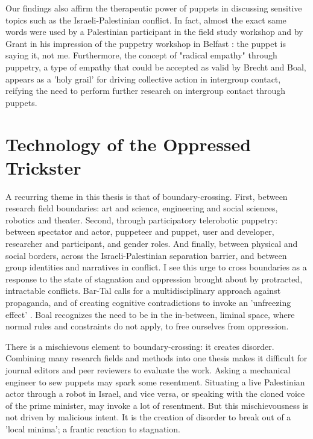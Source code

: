 \documentclass[dissertation,math,vertlayout,pdfa,colorlinks,nologo]{aaltoseries}
\begin{document}
Our findings also affirm the therapeutic power of puppets in discussing sensitive topics such as the Israeli-Palestinian conflict. In fact, almost the exact same words were used by a Palestinian participant in the field study workshop and by Grant in his impression of the puppetry workshop in Belfast \cite{grantObjectsObjectivesApplied2020}: the puppet is saying it, not me. Furthermore, the concept of "radical empathy" through puppetry, a type of empathy that could be accepted as valid by Brecht and Boal, appears as a 'holy grail' for driving collective action in intergroup contact, reifying the need to perform further research on intergroup contact through puppets.

\section{Technology of the Oppressed Trickster}
A recurring theme in this thesis is that of boundary-crossing. First, between research field boundaries: art and science, engineering and social sciences, robotics and theater. Second, through participatory telerobotic puppetry: between spectator and actor, puppeteer and puppet, user and developer, researcher and participant, and gender roles. And finally, between physical and social borders, across the Israeli-Palestinian separation barrier, and between group identities and narratives in conflict. I see this urge to cross boundaries as a response to the state of stagnation and oppression brought about by protracted, intractable conflicts. Bar-Tal calls for a multidisciplinary approach against propaganda, and of creating cognitive contradictions to invoke an 'unfreezing effect' \cite{bar-talDanielBartalIsraelipalestinian2024}. Boal recognizes the need to be in the in-between, liminal space, where normal rules and constraints do not apply, to free ourselves from oppression. 

There is a mischievous element to boundary-crossing: it creates disorder. Combining many research fields and methods into one thesis makes it difficult for journal editors and peer reviewers to evaluate the work. Asking a mechanical engineer to sew puppets may spark some resentment. Situating a live Palestinian actor through a robot in Israel, and vice versa, or speaking with the cloned voice of the prime minister, may invoke a lot of resentment. But this mischievousness is not driven by malicious intent. It is the creation of disorder to break out of a 'local minima'; a frantic reaction to stagnation. 
\end{document}
